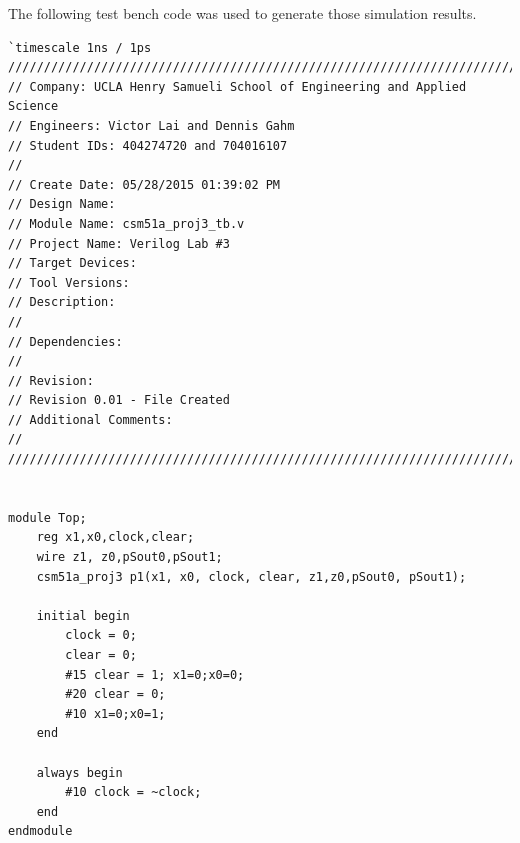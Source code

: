 \documentclass{article}
\begin{document}
The following test bench code was used to generate those simulation results.

\begin{verbatim}
`timescale 1ns / 1ps
/////////////////////////////////////////////////////////////////////////////
// Company: UCLA Henry Samueli School of Engineering and Applied Science
// Engineers: Victor Lai and Dennis Gahm
// Student IDs: 404274720 and 704016107
// 
// Create Date: 05/28/2015 01:39:02 PM
// Design Name: 
// Module Name: csm51a_proj3_tb.v
// Project Name: Verilog Lab #3
// Target Devices: 
// Tool Versions: 
// Description: 
// 
// Dependencies: 
// 
// Revision:
// Revision 0.01 - File Created
// Additional Comments:
// 
/////////////////////////////////////////////////////////////////////////////


module Top;
    reg x1,x0,clock,clear;
    wire z1, z0,pSout0,pSout1;
    csm51a_proj3 p1(x1, x0, clock, clear, z1,z0,pSout0, pSout1);
    
    initial begin
        clock = 0;
        clear = 0;
        #15 clear = 1; x1=0;x0=0;
        #20 clear = 0;
        #10 x1=0;x0=1;
    end
    
    always begin
        #10 clock = ~clock;
    end
endmodule

\end{verbatim}

\end{document}
